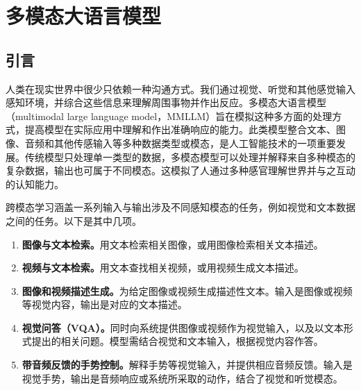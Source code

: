 \chapter{多模态大语言模型}
\label{ch:multimodal}

\section{引言}
人类在现实世界中很少只依赖一种沟通方式。我们通过视觉、听觉和其他感觉输入感知环境，并综合这些信息来理解周围事物并作出反应。多模态大语言模型（multimodal large language model，MMLLM）旨在模拟这种多方面的处理方式，提高模型在实际应用中理解和作出准确响应的能力。此类模型整合文本、图像、音频和其他传感输入等多种数据类型或模态，是人工智能技术的一项重要发展。传统模型只处理单一类型的数据，多模态模型可以处理并解释来自多种模态的复杂数据，输出也可属于不同模态。这模拟了人通过多种感官理解世界并与之互动的认知能力。

跨模态学习涵盖一系列输入与输出涉及不同感知模态的任务，例如视觉和文本数据之间的任务。以下是其中几项。
\begin{enumerate}
\item \textbf{图像与文本检索。}用文本检索相关图像，或用图像检索相关文本描述。
\item \textbf{视频与文本检索。}用文本查找相关视频，或用视频生成文本描述。
\item \textbf{图像和视频描述生成。}为给定图像或视频生成描述性文本。输入是图像或视频等视觉内容，输出是对应的文本描述。
\item \textbf{视觉问答（VQA）。}同时向系统提供图像或视频作为视觉输入，以及以文本形式提出的相关问题。模型需结合视觉和文本输入，根据视觉内容作答。
\item \textbf{带音频反馈的手势控制。}解释手势等视觉输入，并提供相应音频反馈。输入是视觉手势，输出是音频响应或系统所采取的动作，结合了视觉和听觉模态。
\end{enumerate}


